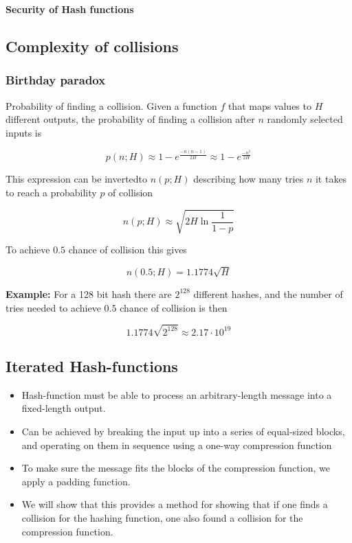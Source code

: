 \textbf{Security of Hash functions}



\subsection{Complexity of collisions}
\subsubsection*{Birthday paradox}
Probability of finding a collision. Given a function $f$ that maps
values to $H$ different outputs, the probability of finding a
collision after $n$ randomly selected inputs is

\[ p(n; H) \approx 1 - e^{\frac{-n(n-1)}{2H}} \approx 1 - e^{\frac{-n^2}{2H}} \]

This expression can be invertedto $n(p; H)$ describing how many tries
$n$ it takes to reach a probability $p$ of collision

\[ n(p; H) \approx \sqrt{2H \ln \frac{1}{1 - p}} \]

To achieve $0.5$ chance of collision this gives

\[ n(0.5; H) = 1.1774 \sqrt{H} \]

\textbf{Example:} For a 128 bit hash there are $2^{128}$ different
hashes, and the number of tries needed to achieve $0.5$ chance of
collision is then

\[ 1.1774 \sqrt{2^{128}} \approx 2.17 \cdot 10^{19} \]

\subsection{Iterated Hash-functions}
\begin{itemize}
\item Hash-function must be able to process an arbitrary-length
  message into a fixed-length output.
\item Can be achieved by breaking the input up into a series of
  equal-sized blocks, and operating on them in sequence using a
  one-way compression function
\item To make sure the message fits the blocks of the compression
  function, we apply a padding function.
\item We will show that this provides a method for showing that if one
  finds a collision for the hashing function, one also found a
  collision for the compression function.
\end{itemize}

